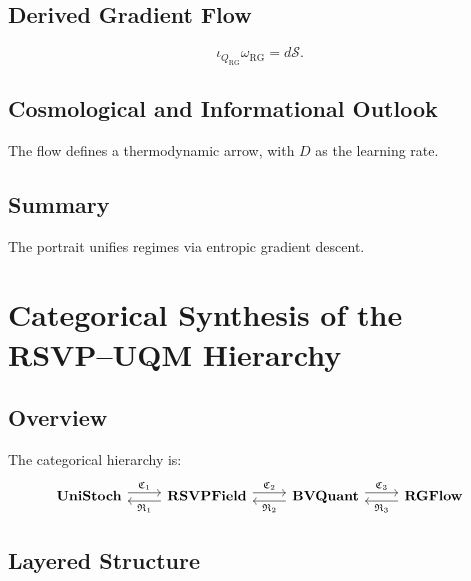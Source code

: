 \documentclass[12pt]{article}
\begin{document}
\subsection{Derived Gradient Flow}

\[
\iota_{Q_{\mathrm{RG}}} \omega_{\mathrm{RG}} = d \mathcal{S}.
\]

\subsection{Cosmological and Informational Outlook}

The flow defines a thermodynamic arrow, with \(D\) as the learning rate.

\subsection{Summary}

The portrait unifies regimes via entropic gradient descent.

\section{Categorical Synthesis of the RSVP–UQM Hierarchy}
\label{app:categorical}

\subsection{Overview}

The categorical hierarchy is:
\[
\begin{tikzcd}
\mathbf{UniStoch} \arrow[r, shift left=0.7ex, "\mathfrak{C}_1"] & \mathbf{RSVPField} \arrow[r, shift left=0.7ex, "\mathfrak{C}_2"] \arrow[l, shift left=0.7ex, "\mathfrak{R}_1"] & \mathbf{BVQuant} \arrow[r, shift left=0.7ex, "\mathfrak{C}_3"] \arrow[l, shift left=0.7ex, "\mathfrak{R}_2"] & \mathbf{RGFlow} \arrow[l, shift left=0.7ex, "\mathfrak{R}_3"]
\end{tikzcd}
\]

\subsection{Layered Structure}
\end{document}
